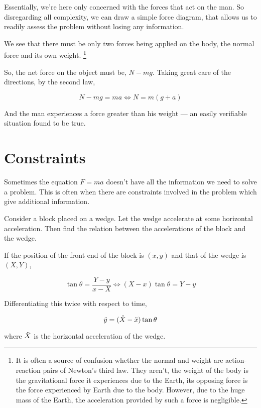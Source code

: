 Essentially, we're here only concerned with the forces that act on the man. So disregarding
all complexity, we can draw a simple force diagram, that allows us to readily assess 
the problem without losing any information.


We see that there must be only two forces being applied on the body,
the normal force and its own weight. \footnote{It is often a source of 
confusion whether the normal and weight are action-reaction pairs of Newton's third law.
They aren't, the weight of the body is the gravitational force it experiences 
due to the Earth, its opposing force is the force experienced by Earth due to the body.
However, due to the huge mass of the Earth, the acceleration provided by such a force is 
negligible.}

So, the net force on the object must be, \(N - mg\). Taking great care of the directions, 
by the second law,

\begin{equation*}
    N - mg = ma \iff N = m(g + a)
\end{equation*}

And the man experiences a force greater than his weight --- an easily verifiable situation found 
to be true.

\section{Constraints}

Sometimes the equation \(F = ma\) doesn't have all the information we need to solve a 
problem. This is often when there are constraints involved in the problem which give 
additional information.

\begin{marginfigure}
\end{marginfigure}

\begin{example}
Consider a block placed on a wedge. Let the wedge accelerate 
at some horizontal acceleration. Then find the relation between the accelerations 
of the block and the wedge.

\begin{soln}
    If the position of the front end of the block is 
    \((x,y)\) and that of the wedge is \((X, Y)\), 

    \begin{equation*}
        \tan\theta = \frac{Y-y}{x - X} \iff (X - x)\tan\theta = Y - y
    \end{equation*}

    Differentiating this twice with respect to time, 

    \begin{equation}
        \ddot{y} = (\ddot{X} - \ddot{x}) \tan\theta
    \end{equation}

    where \(\ddot{X}\) is the horizontal acceleration of the wedge.
\end{soln}
\end{example}


